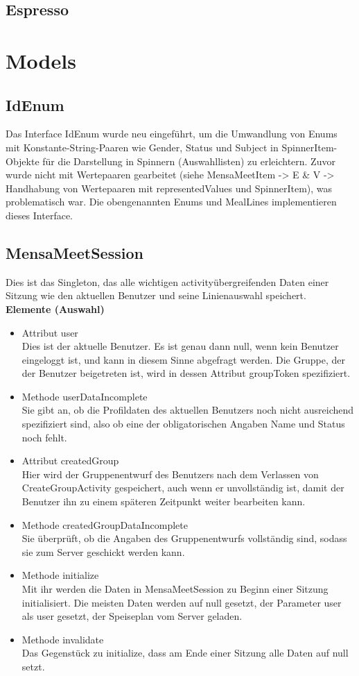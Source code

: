 \documentclass[a4paper]{scrreprt}
\begin{document}
\subsection{Espresso}

\section{Models}
\subsection{IdEnum}
Das Interface IdEnum wurde neu eingeführt, um die Umwandlung von Enums mit Konstante-String-Paaren wie Gender, Status und Subject in SpinnerItem-Objekte für die Darstellung in Spinnern (Auswahllisten) zu erleichtern. Zuvor wurde nicht mit Wertepaaren gearbeitet (siehe MensaMeetItem -> E \& V -> Handhabung von Wertepaaren mit representedValues und SpinnerItem), was problematisch war. Die obengenannten Enums und MealLines implementieren dieses Interface.

\subsection{MensaMeetSession}
Dies ist das Singleton, das alle wichtigen activityübergreifenden Daten einer Sitzung wie den aktuellen Benutzer und seine Linienauswahl speichert. \\
\textbf{Elemente (Auswahl)}

\begin{itemize}
\item Attribut user \\
Dies ist der aktuelle Benutzer. Es ist genau dann null, wenn kein Benutzer eingeloggt ist, und kann in diesem Sinne abgefragt werden. Die Gruppe, der der Benutzer beigetreten ist, wird in dessen Attribut groupToken spezifiziert.
\item Methode userDataIncomplete \\
Sie gibt an, ob die Profildaten des aktuellen Benutzers noch nicht ausreichend spezifiziert sind, also ob eine der obligatorischen Angaben Name und Status noch fehlt.
\item Attribut createdGroup \\
Hier wird der Gruppenentwurf des Benutzers nach dem Verlassen von CreateGroupActivity gespeichert, auch wenn er unvollständig ist, damit der Benutzer ihn zu einem späteren Zeitpunkt weiter bearbeiten kann.
\item Methode createdGroupDataIncomplete \\
Sie überprüft, ob die Angaben des Gruppenentwurfs vollständig sind, sodass sie zum Server geschickt werden kann.
\item Methode initialize \\
Mit ihr werden die Daten in MensaMeetSession zu Beginn einer Sitzung initialisiert. Die meisten Daten werden auf null gesetzt, der Parameter user als user gesetzt, der Speiseplan vom Server geladen.
\item Methode invalidate \\
Das Gegenstück zu initialize, dass am Ende einer Sitzung alle Daten auf null setzt.
\end{itemize}
\end{document}

